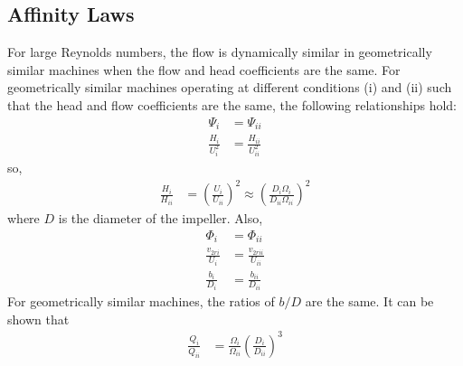 \subsection{Affinity Laws}
For large Reynolds numbers, the flow is dynamically similar in geometrically similar machines when the flow and head coefficients are the same. For geometrically similar machines operating at different conditions (i) and (ii) such that the head and flow coefficients are the same, the following relationships hold:
\begin{align*}
    \Psi_i &= \Psi_{ii}  \\
    \frac{H_i}{U_i^2} &= \frac{H_{ii}}{U_{ii}^2} 
\end{align*}
so,
\begin{align}
    \frac{H_i}{H_{ii}} &= \left(\frac{U_i}{U_{ii}}\right)^2 \approx \left(\frac{D_i \Omega_i}{D_{ii} \Omega_{ii}}\right)^2 \label{eq:affinity1}
\end{align}
where $D$ is the diameter of the impeller. Also,
\begin{align}
    \Phi_i &= \Phi_{ii}  \nonumber \\
    \frac{v_{2ri}}{U_i} &= \frac{v_{2rii}}{U_{ii}} \label{eq:affinity2} \\
    \frac{b_i}{D_i} &= \frac{b_{ii}}{D_{ii}} \label{eq:affinity_geometrical_similarity}
\end{align}
For geometrically similar machines, the ratios of $b/D$ are the same. It can be shown that
\begin{align}
    \frac{Q_i}{Q_{ii}} &= \frac{\Omega_i}{\Omega_{ii}} \left(\frac{D_{i}}{D_{ii}}\right)^3 \label{eq:affinity_law_for_flow}
\end{align}


